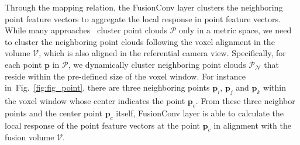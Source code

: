\documentclass[letterpaper, 10 pt, conference]{ieeeconf}
\newcommand{\Fref}[1]{Fig.~\textcolor{blue}{\ref{#1}}}
\begin{document}
Through the mapping relation, the FusionConv layer clusters the neighboring point feature vectors to aggregate the local response in point feature vectors. While many approaches~\cite{continuous_conv,point_conv,dynamic_graph_conv,interp_conv} cluster point clouds $\mathcal{P}$ only in a metric space, we need to cluster the neighboring point clouds following the voxel alignment in the volume $\mathcal{V}$, which is also aligned in the referential camera view. Specifically, for each point $\textbf{p}$ in $\mathcal{P}$, we dynamically cluster neighboring point clouds $\mathcal{P}_{\mathcal{N}}$ 
that reside within the pre-defined size of the voxel window. For instance in~\Fref{fig:fig_point}, there are three neighboring points $\textbf{p}_{i}$, $\textbf{p}_{j}$ and $\textbf{p}_{k}$ within the voxel window whose center indicates the point $\textbf{p}_{c}$. From these three neighbor points and the center point $\textbf{p}_{c}$ itself, FusionConv layer is able to calculate the local response of the point feature vectors at the point $\textbf{p}_{c}$ in alignment with the fusion volume $\mathcal{V}$.
\end{document}

